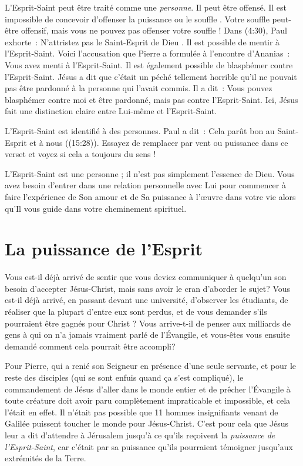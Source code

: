 L'Esprit-Saint peut être traité comme une \emph{personne}. Il peut être offensé.
 Il est impossible de concevoir d'offenser \og la puissance \fg{} ou
 \og le souffle \fg{}. Votre souffle peut-être offensif, mais vous ne pouvez
 pas offenser votre souffle ! Dans (4:30), Paul exhorte~:
 \og N'attristez pas le Saint-Esprit de Dieu \fg{}.
 Il est possible de mentir à l'Esprit-Saint. Voici l'accusation que Pierre a
 formulée à l'encontre d'Ananias~:
 \og Vous avez menti à l'Esprit-Saint. \fg{}
 Il est également possible de blasphémer contre l'Esprit-Saint.
 Jésus a dit que c'était un péché tellement horrible qu'il ne pouvait pas
 être pardonné à la personne qui l'avait commis. Il a dit~:
 \og Vous pouvez blasphémer contre moi et être pardonné, mais pas contre
 l'Esprit-Saint. \fg{}
 Ici, Jésus fait une distinction claire entre Lui-même et l'Esprit-Saint.

L'Esprit-Saint est identifié à des personnes. Paul a dit~:
 \og Cela parût bon au Saint-Esprit et à nous \fg{}
 ((15:28)).
 Essayez de remplacer par vent ou puissance dans ce verset et voyez si cela
 a toujours du sens !

L'Esprit-Saint est une personne ; il n'est pas simplement l'essence de Dieu.
 Vous avez besoin d'entrer dans une relation personnelle avec Lui pour
 commencer à faire l'expérience de Son amour et de Sa puissance à l'œuvre
 dans votre vie alors qu'Il vous guide dans votre cheminement spirituel.


\section*{La puissance de l'Esprit}

Vous est-il déjà arrivé de sentir que vous deviez communiquer à quelqu'un
son besoin d'accepter Jésus-Christ, mais sans avoir le cran d'aborder le sujet?
 Vous est-il déjà arrivé, en passant devant une université,
 d'observer les étudiants, de réaliser que la plupart d'entre eux sont perdus,
 et de vous demander s'ils pourraient être gagnés pour Christ ?
 Vous arrive-t-il de penser aux milliards de gens à qui on n'a jamais vraiment
 parlé de l'Évangile, et vous-êtes vous ensuite demandé comment cela pourrait
 être accompli?

Pour Pierre, qui a renié son Seigneur en présence d'une seule servante,
 et pour le reste des disciples (qui se sont enfuis quand ça s'est compliqué),
 le commandement de Jésus d'aller dans le monde entier et de prêcher
 l'Évangile à toute créature doit avoir paru complètement impraticable et
 impossible, et cela l'était en effet.
 Il n'était pas possible que 11 hommes insignifiants venant de Galilée
 puissent toucher le monde pour Jésus-Christ.
 C'est pour cela que Jésus leur a dit d'attendre à Jérusalem jusqu'à ce
 qu'ils reçoivent la \emph{puissance de l'Esprit-Saint}, car c'était par
 sa puissance qu'ils pourraient témoigner jusqu'aux extrémités de la Terre.

